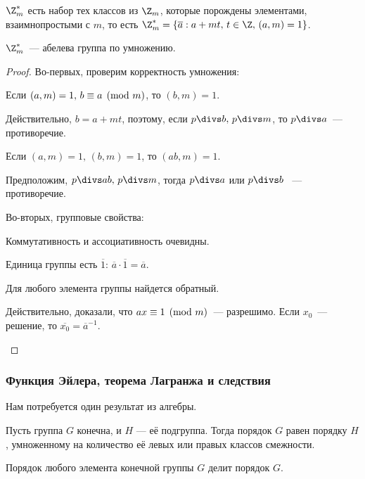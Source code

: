 \begin{df}
$\Z_m^*$ есть набор тех классов из $\Z_m$, которые порождены элементами, 
взаимнопростыми с $m$, то есть 
$\Z_m^* =\{\overline{a}: a + mt,\,t \in \Z,\,(a,m) = 1 \}$.
\end{df}
\begin{stm}
  $\Z_m^*$~— абелева группа по умножению.
\end{stm}
\begin{proof}
  Во-первых, проверим корректность умножения:
  \begin{points}{0}
    \item Если $(a,m) = 1,\, b \equiv a \pmod m$, то $(b,m) = 1$. \par
		Действительно, $b = a+mt$, поэтому, если $p \divs b,\,p \divs m$, то 
		$p \divs a$~—противоречие.
    \item Если $(a,m) = 1,\,(b,m) = 1$, то $(ab,m) = 1$. \par
		Предположим, $p \divs ab,\,p \divs m$, тогда $p \divs a$ или $p \divs b$
		~— противоречие.
  \end{points}

  Во-вторых, групповые свойства:
  \begin{points}{0}
    \item Коммутативность и ассоциативность очевидны.
    \item Единица группы есть $\overline{1}$: $\overline{a}\cdot\overline{1}=\overline{a}$.
    \item Для любого элемента группы найдется обратный.\par
		Действительно, доказали, что $ax \equiv 1 \pmod m$~— разрешимо. Если $x_0$~— 
		решение, то $\overline{x_0} = \overline{a}^{-1}$.
  \end{points}
\end{proof}

\subsubsection{Функция Эйлера, теорема Лагранжа и следствия}

Нам потребуется один результат из алгебры.

\begin{theorem}[Лагранж]
Пусть группа $G$ конечна, и $H$ — её подгруппа. Тогда порядок $G$ равен порядку 
$H$, умноженному на количество её левых или правых классов смежности.
\end{theorem}

\begin{imp}
Порядок любого элемента конечной группы $G$ делит порядок $G$.
\end{imp}


